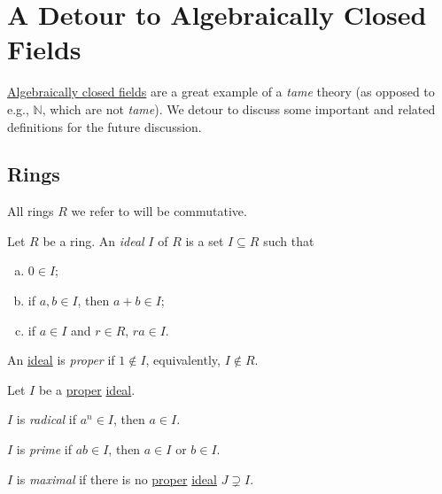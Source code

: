 \section{A Detour to Algebraically Closed Fields}
\hyperref[def:algebraically-closed]{Algebraically closed fields} are a great example of a \emph{tame} theory (as opposed to e.g., \(\mathbb{N} \), which are not \emph{tame}). We detour to discuss some important and related definitions for the future discussion.

\subsection{Rings}
All rings \(R\) we refer to will be commutative.

\begin{definition}[Ideal]\label{def:ideal}
	Let \(R\) be a ring. An \emph{ideal} \(I\) of \(R\) is a set \(I \subseteq R\) such that
	\begin{enumerate}[(a)]
		\item \(0\in I\);
		\item if \(a, b\in I\), then \(a+b\in I\);
		\item if \(a\in I\) and \(r\in R\), \(ra\in I\).
	\end{enumerate}
\end{definition}

\begin{definition}[Proper]\label{def:proper}
	An \hyperref[def:ideal]{ideal} is \emph{proper} if \(1 \notin I\), equivalently, \(I \notin R\).
\end{definition}

\begin{definition*}
	Let \(I\) be a \hyperref[def:proper]{proper} \hyperref[def:ideal]{ideal}.

	\begin{definition}[Radical]\label{def:radical}
		\(I\) is \emph{radical}	if \(a^n\in I\), then \(a\in I\).
	\end{definition}

	\begin{definition}[Prime]\label{def:prime}
		\(I\) is \emph{prime} if \(ab\in I\), then \(a\in I\) or \(b\in I\).
	\end{definition}

	\begin{definition}[Maximal]\label{def:proper-ideal-maximal}
		\(I\) is \emph{maximal} if there is no \hyperref[def:proper]{proper} \hyperref[def:ideal]{ideal} \(J \supsetneq I \).
	\end{definition}
\end{definition*}

